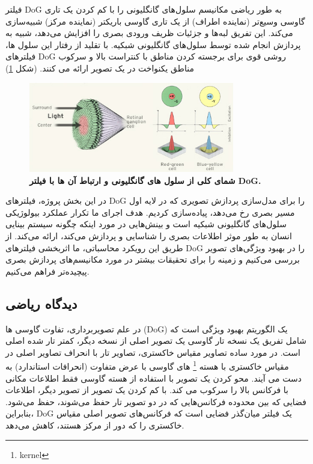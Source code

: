     فیلتر 
    DoG 
    به طور ریاضی مکانیسم سلول‌های گانگلیونی را با کم کردن یک تاری گاوسی وسیع‌تر 
    (نماینده اطراف) 
    از یک تاری گاوسی باریکتر 
    (نماینده مرکز) 
    شبیه‌سازی می‌کند. این تفریق لبه‌ها و جزئیات ظریف ورودی بصری را افزایش می‌دهد، شبیه به پردازش انجام شده توسط سلول‌های گانگلیونی شبکیه. با تقلید از رفتار این سلول ها، فیلترهای 
    DoG 
    روشی قوی برای برجسته کردن مناطق با کنتراست بالا و سرکوب مناطق یکنواخت در یک تصویر ارائه می کنند.
    (شکل \ref{fig:part1-ganglion-cells-schematic})
    \begin{figure}[!ht]
        \centering
        \includegraphics[width=0.8\textwidth]{images/ganglion-cells.jpg} 
        \captionsetup{width=.8\linewidth}
        \caption{\textbf{شمای کلی از سلول های گانگلیونی و ارتباط آن ها با فیلتر 
        DoG.}}
        \label{fig:part1-ganglion-cells-schematic}
    \end{figure}
    در این بخش پروژه، فیلترهای 
    DoG 
    را برای مدل‌سازی پردازش تصویری که در لایه اول مسیر بصری رخ می‌دهد، پیاده‌سازی کردیم. هدف اجرای ما تکرار عملکرد بیولوژیکی سلول‌های گانگلیونی شبکیه است و بینش‌هایی در مورد اینکه چگونه سیستم بینایی انسان به طور موثر اطلاعات بصری را شناسایی و پردازش می‌کند، ارائه می‌کند. از طریق این رویکرد محاسباتی، ما اثربخشی فیلترهای 
    DoG 
    را در بهبود ویژگی‌های تصویر بررسی می‌کنیم و زمینه را برای تحقیقات بیشتر در مورد مکانیسم‌های پردازش بصری پیچیده‌تر فراهم می‌کنیم.

    \subsection{دیدگاه ریاضی}
        در علم تصویربرداری، تفاوت گاوسی ها 
        (DoG) 
        یک الگوریتم بهبود ویژگی است که شامل تفریق یک نسخه تار گاوسی یک تصویر اصلی از نسخه دیگر، کمتر تار شده اصلی است. در مورد ساده تصاویر مقیاس خاکستری، تصاویر تار با انحراف تصاویر اصلی در مقیاس خاکستری با هسته
        \footnote{kernel}
        های گاوسی با عرض متفاوت 
        (انحرافات استاندارد) 
        به دست می آیند. محو کردن یک تصویر با استفاده از هسته گاوسی فقط اطلاعات مکانی با فرکانس بالا را سرکوب می کند. با کم کردن یک تصویر از تصویر دیگر، اطلاعات فضایی که بین محدوده فرکانس‌هایی که در دو تصویر تار حفظ می‌شوند، حفظ می‌شود. بنابراین، 
        DoG 
        یک فیلتر  میان‌گذر فضایی است که فرکانس‌های تصویر اصلی مقیاس خاکستری را که دور از مرکز هستند، کاهش می‌دهد.
 
